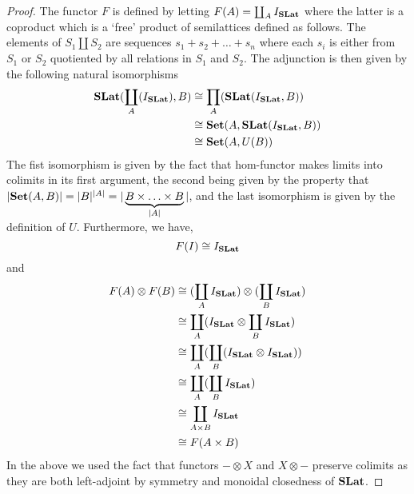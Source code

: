     \begin{proof}
      The functor $F$ is defined by letting $F(A) = \coprod_{A} I_{\mathbf{SLat}}$ where the latter is a coproduct which is a `free' product of semilattices defined as follows.
      The elements of $S_{1} \coprod S_{2}$ are sequences $s_{1} + s_{2} + \ldots + s_{n}$ where each $s_{i}$ is either from $S_{1}$ or $S_{2}$ quotiented by all relations in $S_{1}$ and $S_{2}$.
      The adjunction is then given by the following natural isomorphisms
      \begin{align*}
      \mathbf{SLat}(\coprod_{A}(I_{\mathbf{SLat}}), B) &\cong \prod_{A}(\mathbf{SLat}(I_{\mathbf{SLat}}, B))\\
                                                         &\cong \mathbf{Set}(A,\mathbf{SLat}(I_{\mathbf{SLat}}, B))\\
                                                         &\cong \mathbf{Set}(A, U(B))
      \end{align*}
      The fist isomorphism is given by the fact that hom-functor makes limits into colimits in its first argument, the second being given by the property that $|\mathbf{Set}(A,B)| = |B|^{|A|} = |\underbrace{B \times \ldots \times B}_{|A|}|$, and the last isomorphism is given by the definition of $U$.
      Furthermore, we have, 
      \[
      F(I) \cong I_{\mathbf{SLat}}
      \]
      and 
      \begin{align*}
      F(A) \otimes F(B) &\cong (\coprod_{A} I_{\mathbf{SLat}}) \otimes (\coprod_{B} I_{\mathbf{SLat}})\\
            &\cong \coprod_{A} (I_{\mathbf{SLat}} \otimes \coprod_{B} I_{\mathbf{SLat}})\\
            &\cong \coprod_{A} (\coprod_{B} (I_{\mathbf{SLat}} \otimes I_{\mathbf{SLat}}))\\
            &\cong \coprod_{A} (\coprod_{B} I_{\mathbf{SLat}})\\
            &\cong \coprod_{A \times B} I_{\mathbf{SLat}}\\
            &\cong F(A \times B)
      \end{align*}
    In the above we used the fact that functors $- \otimes X$ and $X \otimes -$ preserve colimits as they are both left-adjoint by symmetry and monoidal closedness of $\mathbf{SLat}$.
    \end{proof}

